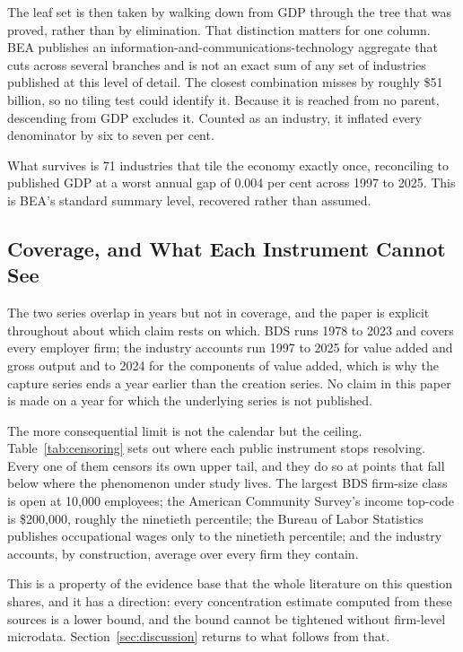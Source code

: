 \documentclass[jrfm,article,submit,pdftex,moreauthors]{Definitions/mdpi}
\begin{document}
The leaf set is then taken by walking down from GDP through the tree that was proved, rather
than by elimination. That distinction matters for one column. BEA publishes an
information-and-communications-technology aggregate that cuts across several branches and is
not an exact sum of any set of industries published at this level of detail. The closest
combination misses by roughly \$51 billion, so no tiling test could identify it. Because
it is reached from no parent, descending from GDP excludes it. Counted as an industry, it
inflated every denominator by six to seven per cent.

What survives is 71 industries that tile the economy exactly once, reconciling to published
GDP at a worst annual gap of 0.004 per cent across 1997 to 2025. This is BEA's standard
summary level, recovered rather than assumed.

\subsection{Coverage, and What Each Instrument Cannot See}
\label{subsec:censoring}

The two series overlap in years but not in coverage, and the paper is explicit throughout
about which claim rests on which. BDS runs 1978 to 2023 and covers every employer firm; the
industry accounts run 1997 to 2025 for value added and gross output and to 2024 for the
components of value added, which is why the capture series ends a year earlier than the
creation series. No claim in this paper is made on a year for which the underlying series is
not published.

The more consequential limit is not the calendar but the ceiling. Table~\ref{tab:censoring}
sets out where each public instrument stops resolving. Every one of them censors its own
upper tail, and they do so at points that fall below where the phenomenon under study lives.
The largest BDS firm-size class is open at 10{,}000 employees; the American Community
Survey's income top-code is \$200{,}000, roughly the ninetieth percentile; the Bureau of
Labor Statistics publishes occupational wages only to the ninetieth percentile; and the
industry accounts, by construction, average over every firm they contain.

This is a property of the evidence base that the whole literature on this question
shares, and it has a direction: every concentration
estimate computed from these sources is a lower bound, and the bound cannot be tightened
without firm-level microdata. Section~\ref{sec:discussion} returns to what follows from
that.
\end{document}
